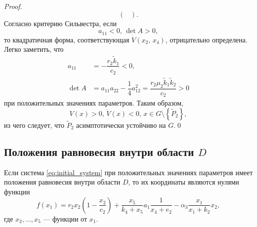 \documentclass[14pt,a4paper]{extarticle}
\begin{document}
\begin{proof}
\[\begin{pmatrix}
		\end{pmatrix}.\]
		Согласно критерию Сильвестра, если 
		\[a_{11}<0,\, \det A>0,\]
		то квадратичная форма, соответствующая $\dot{V}(x_2,\, x_4)$, отрицательно определена. Легко заметить, что 
		\begin{align*}
			a_{11} &= -\dfrac{r_2\tilde{k}_1}{c_2}<0,\\
			\det A &= a_{11}a_{22}-\dfrac{1}{4}a^2_{12} = \dfrac{r_2\mu_2\tilde{k}_1\tilde{k}_2}{c_2}>0
		\end{align*}
		при положительных значениях параметров. Таким образом, 
		\[V(x)>0,\, \dot{V}(x)<0,\, x\in G\setminus\left\{\tilde{P}_2\right\},\]
		из чего следует, что $\tilde{P}_2$ асимптотически устойчиво на $G$.\qed
	\end{proof}
	
	\subsection{Положения равновесия внутри области $D$}
	\begin{theorem}\label{th:inner_eqpoint}
		Если система \ref{eq:initial_system} при положительных значениях параметров имеет положения равновесия внутри области $D$, то их координаты являются нулями функции
		\[f(x_1)=r_2x_2\left(1-\dfrac{x_2}{c_2}\right)+\dfrac{x_5}{k_4+x_5}a_1\dfrac{1}{x_4+e_2}-\alpha_3\dfrac{x_1}{x_1+k_2}x_2,\]
		где $x_2,\ldots,x_5$ --- функции от $x_1$.
	\end{theorem}
\end{document}
